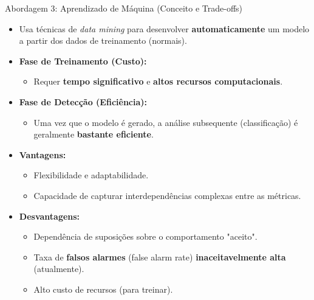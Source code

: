 \begin{frame}{Abordagem 3: Aprendizado de Máquina (Conceito e Trade-offs)}
    \begin{itemize}
        \item Usa técnicas de \textit{data mining} para desenvolver \textbf{automaticamente} um modelo a partir dos dados de treinamento (normais).

        \item \textbf{Fase de Treinamento (Custo):}
              \begin{itemize}
                  \item Requer \textbf{tempo significativo} e \textbf{altos recursos computacionais}.
              \end{itemize}

        \item \textbf{Fase de Detecção (Eficiência):}
              \begin{itemize}
                  \item Uma vez que o modelo é gerado, a análise subsequente (classificação) é geralmente \textbf{bastante eficiente}.
              \end{itemize}

        \item \textbf{Vantagens:}
              \begin{itemize}
                  \item Flexibilidade e adaptabilidade.
                  \item Capacidade de capturar interdependências complexas entre as métricas.
              \end{itemize}

        \item \textbf{Desvantagens:}
              \begin{itemize}
                  \item Dependência de suposições sobre o comportamento "aceito".
                  \item Taxa de \textbf{falsos alarmes} (false alarm rate) \textbf{inaceitavelmente alta} (atualmente).
                  \item Alto custo de recursos (para treinar).
              \end{itemize}
    \end{itemize}
\end{frame}

